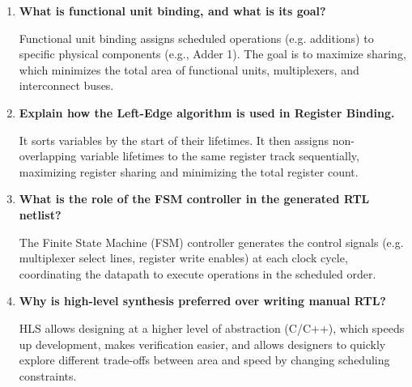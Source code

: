 \documentclass[12pt,a4paper]{article}
\newcommand{\Q}[1]{\textbf{#1}\par\noindent\ignorespaces}
\begin{document}
\begin{tcolorbox}[exambox, title={\textbf{Frequently Asked / Viva Questions}}]
\begin{enumerate}[leftmargin=*, topsep=0pt, label=\textbf{Q\arabic*.}, itemsep=6pt]
  \item \Q{What is functional unit binding, and what is its goal?}
        Functional unit binding assigns scheduled operations (e.g. additions) to specific physical components (e.g., Adder 1). The goal is to maximize sharing, which minimizes the total area of functional units, multiplexers, and interconnect buses.
        
  \item \Q{Explain how the Left-Edge algorithm is used in Register Binding.}
        It sorts variables by the start of their lifetimes. It then assigns non-overlapping variable lifetimes to the same register track sequentially, maximizing register sharing and minimizing the total register count.
        
  \item \Q{What is the role of the FSM controller in the generated RTL netlist?}
        The Finite State Machine (FSM) controller generates the control signals (e.g. multiplexer select lines, register write enables) at each clock cycle, coordinating the datapath to execute operations in the scheduled order.
        
  \item \Q{Why is high-level synthesis preferred over writing manual RTL?}
        HLS allows designing at a higher level of abstraction (C/C++), which speeds up development, makes verification easier, and allows designers to quickly explore different trade-offs between area and speed by changing scheduling constraints.
\end{enumerate}
\end{tcolorbox}

\vspace{6pt}
\end{document}
